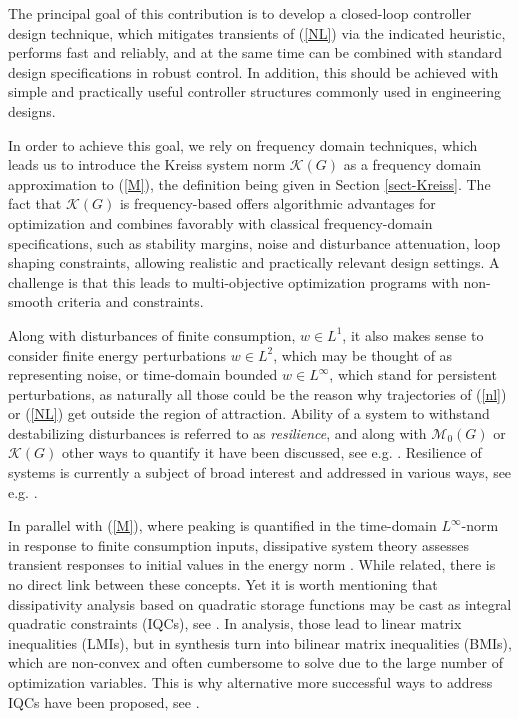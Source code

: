 \documentclass[12pt, a4paper,reqno]{amsart}
\theoremstyle{definition}
\begin{document}
The principal goal of this contribution  is to develop a closed-loop controller design technique,
which mitigates transients of (\ref{NL}) via the indicated heuristic, performs fast and reliably, and
at the same time can be combined with standard design specifications in robust control. In addition, this
should be achieved with simple and practically useful
controller structures commonly used in engineering designs.

In order to achieve this goal,
we rely on frequency domain techniques, which
leads us to
introduce the  Kreiss system norm $\mathcal K(G)$ as a frequency domain approximation to (\ref{M}),  
the definition being given in
Section \ref{sect-Kreiss}. The fact that $\mathcal K(G)$ is frequency-based  offers algorithmic advantages
for optimization 
and
combines favorably with classical frequency-domain specifications, such as stability margins, noise and disturbance attenuation, loop shaping constraints,
allowing realistic and practically relevant design settings. A challenge is that this leads to multi-objective optimization
programs with non-smooth criteria and constraints.
 


Along with disturbances of finite consumption,  $w\in L^1$, it also makes sense to consider finite energy perturbations $w\in L^2$, 
which may be thought of as representing
noise, or time-domain bounded $w \in L^\infty$, which stand for persistent perturbations, as naturally all those could
be the reason why trajectories of (\ref{nl}) or (\ref{NL})  get outside the region of attraction. 
Ability of a system to withstand destabilizing disturbances is referred to as {\it resilience}, and 
along with $\mathcal M_0(G)$ or $\mathcal K(G)$ other ways to quantify  it have been discussed, see e.g.
\cite{krakov}. 
%
Resilience of systems is currently a subject of broad interest  and addressed in various ways, see e.g.
\cite{ghanbari24,demmer23,bouvier23,boerner21}. 




In parallel with (\ref{M}), where peaking is quantified in the time-domain $L^\infty$-norm in response to finite consumption inputs,  
dissipative system theory assesses transient responses to initial values in the energy norm
\cite{Packard2003b,khong_24,khong25,Veenmann2013}.
While related, there is no direct link between these concepts. Yet it is worth mentioning that dissipativity analysis based on quadratic storage functions may be cast as 
integral quadratic constraints (IQCs), see \cite{seiler_2015}. In analysis,
those lead to linear matrix inequalities (LMIs),  but in synthesis turn into
bilinear matrix inequalities (BMIs), which are non-convex and often cumbersome to solve due to the large number of optimization variables.
This is why alternative more successful
ways to address IQCs have been proposed, see \cite{gahinet20,simoes20,an_iqc,mixedApkarianNoll}.
\end{document}

